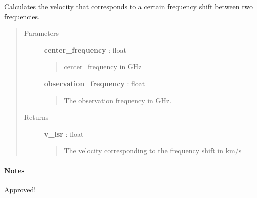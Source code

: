 \documentclass[a4paper,10pt,english]{sphinxmanual}
\begin{document}
\begin{fulllineitems}
\label{functions:astrolyze.functions.astro_functions.v_lsr}
Calculates the velocity that corresponds to a certain frequency shift
between two frequencies.
\begin{quote}\begin{description}
\item[{Parameters }] \leavevmode
\textbf{center\_frequency} : float
\begin{quote}

center\_frequency in GHz
\end{quote}

\textbf{observation\_frequency} : float
\begin{quote}

The observation frequency in GHz.
\end{quote}

\item[{Returns }] \leavevmode
\textbf{v\_lsr} : float
\begin{quote}

The velocity corresponding to the frequency shift in km/s
\end{quote}

\end{description}\end{quote}
\paragraph{Notes}

Approved!

\end{fulllineitems}

\end{document}
